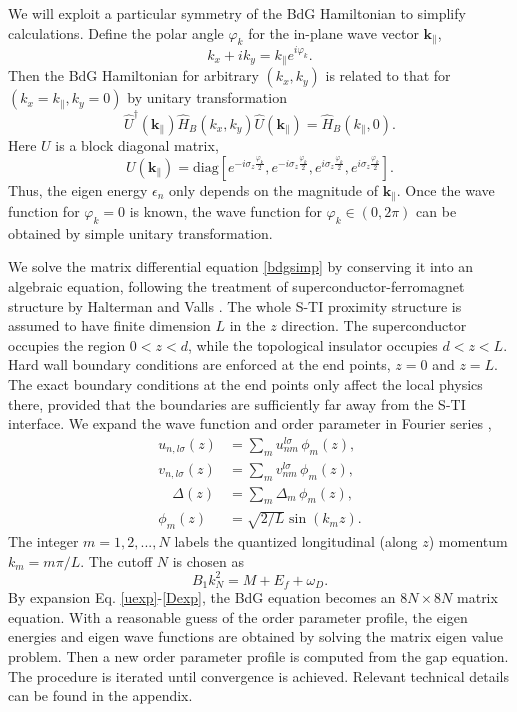 \documentclass[11pt]{report}
\newcommand{\kperp}{\mathbf{k}_\parallel}
\begin{document}
We will exploit a particular symmetry of the BdG Hamiltonian to simplify 
calculations. Define the polar angle $\varphi_k$ for the in-plane wave vector $\kperp$, 
\begin{equation}
k_x+ik_y=k_{\parallel}e^{i\varphi_k}.
\end{equation}
Then the BdG Hamiltonian for arbitrary $(k_x,k_y)$ is
related to that for $(k_x=k_\parallel,k_y=0)$ by unitary transformation 
\begin{equation}
\hat{U}^\dagger(\kperp) \hat{H}_{B}(k_x,k_y) \hat{U}(\kperp) = \hat{H}_{B}(k_\parallel,0).
\label{symm}
\end{equation}
Here $U$ is a 
block diagonal matrix,
\begin{equation}
U(\kperp)=\mathrm{diag}[e^{-i\sigma_z\frac{\varphi_k}{2}}, e^{-i\sigma_z\frac{\varphi_k}{2}}, e^{i\sigma_z\frac{\varphi_k}{2}},e^{i\sigma_z\frac{\varphi_k}{2}} ]. \label{unit}
\end{equation}
Thus, the eigen energy $\epsilon_n$ only depends on the magnitude of $\kperp$.
Once the wave function for $\varphi_k=0$ is known, the wave function for $\varphi_k\in (0,2\pi)$
can be obtained by simple unitary transformation.

We solve the matrix differential equation \eqref{bdgsimp} by conserving it into an algebraic equation, 
following the treatment of superconductor-ferromagnet structure by 
Halterman and Valls \cite{h-v}. The whole S-TI proximity structure is assumed to have 
finite dimension $L$ in the $z$
direction. The superconductor occupies the region $0<z<d$,
while the topological insulator occupies $d<z<L$. Hard wall boundary conditions are enforced at the end points, 
$z=0$ and $z=L$.  
The exact boundary conditions at the end points only affect the local physics there, provided 
that the boundaries are sufficiently far away from the S-TI interface. We expand the wave function
and order parameter in Fourier series \cite{h-v},
\begin{align}
u_{n,l\sigma}(z) &= \sum_m u_{nm}^{l \sigma}\,\phi_m(z),\label{uexp}\\ 
v_{n,l\sigma}(z) &= \sum_m v_{nm}^{l \sigma}\, \phi_m(z),\\
\quad \Delta(z) &= \sum_m \Delta_{m}\, \phi_m(z) , \label{Dexp}\\
\phi_m(z)&=\sqrt{2/L}\sin(k_m z).
\end{align}
The integer $m=1,2,...,N$ labels the quantized longitudinal (along $z$) momentum $k_m=m\pi/L$. 
The cutoff $N$ is chosen as \cite{s-v}
\begin{equation}
B_1k^2_N=M+E_f+\omega_D. \label{eq-N}
\end{equation}
By expansion Eq. \eqref{uexp}-\eqref{Dexp}, the BdG equation
becomes an $8N \times 8N$ matrix equation. With a reasonable guess of the order parameter profile, 
the eigen energies and eigen wave functions are obtained by solving the matrix eigen value problem.
Then a new order parameter profile is computed from the gap equation. The procedure is iterated
until convergence is achieved.  Relevant technical details can be found
in the appendix. 
\end{document}
